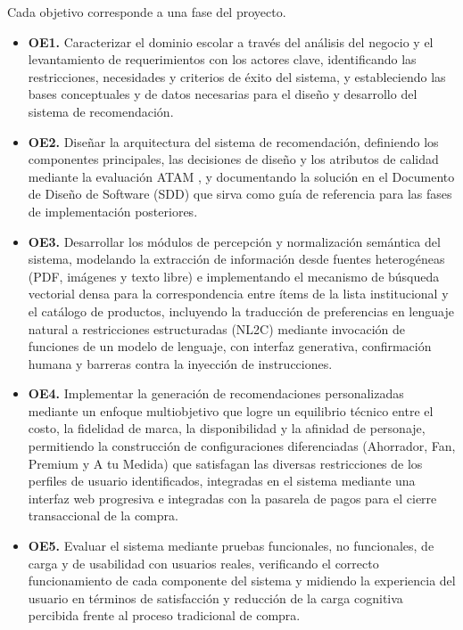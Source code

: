 Cada objetivo corresponde a una fase del proyecto.

\begin{itemize}
    \item \textbf{OE1.} Caracterizar el dominio escolar a través del análisis del negocio
    y el levantamiento de requerimientos con los actores clave, identificando las
    restricciones, necesidades y criterios de éxito del sistema, y estableciendo las
    bases conceptuales y de datos necesarias para el diseño y desarrollo del sistema de
    recomendación.
    \item \textbf{OE2.} Diseñar la arquitectura del sistema de recomendación, definiendo
    los componentes principales, las decisiones de diseño y los atributos de calidad
    mediante la evaluación ATAM \citep{bass_software_2021}, y documentando la solución en
    el Documento de Diseño de Software (SDD) que sirva como guía de referencia para las
    fases de implementación posteriores.
    \item \textbf{OE3.} Desarrollar los módulos de percepción y normalización semántica
    del sistema, modelando la extracción de información desde fuentes heterogéneas (PDF,
    imágenes y texto libre) e implementando el mecanismo de búsqueda vectorial densa para la
    correspondencia entre ítems de la lista institucional y el catálogo de productos,
    incluyendo la traducción de preferencias en lenguaje natural a restricciones estructuradas
    (NL2C) mediante invocación de funciones de un modelo de lenguaje, con interfaz generativa,
    confirmación humana y barreras contra la inyección de instrucciones.
    \item \textbf{OE4.} Implementar la generación de recomendaciones personalizadas mediante un
    enfoque multiobjetivo que logre un equilibrio técnico entre el costo, la fidelidad de marca,
    la disponibilidad y la afinidad de personaje, permitiendo la construcción de configuraciones
    diferenciadas (Ahorrador, Fan, Premium y A tu Medida) que satisfagan las diversas
    restricciones de los perfiles de usuario identificados, integradas en el sistema mediante una
    interfaz web progresiva e integradas con la pasarela de pagos para el cierre transaccional de
    la compra.
    \item \textbf{OE5.} Evaluar el sistema mediante pruebas funcionales, no funcionales,
    de carga y de usabilidad con usuarios reales, verificando el correcto funcionamiento
    de cada componente del sistema y midiendo la experiencia del usuario en términos de
    satisfacción y reducción de la carga cognitiva percibida
    \citep{sweller_cognitive_2011} frente al proceso tradicional
    de compra.
\end{itemize}


